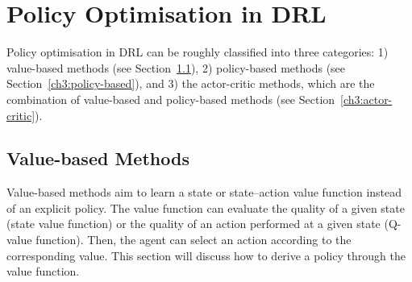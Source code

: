 \section{Policy Optimisation in DRL}
\label{ch3:policy-optim}
Policy optimisation in DRL can be roughly classified into three categories: 1) value-based methods (see Section~\ref{ch3:value-based}), 2) policy-based methods (see Section~\ref{ch3:policy-based}), and 3) the actor-critic methods, which are the combination of value-based and policy-based methods (see Section~\ref{ch3:actor-critic}).

\subsection{Value-based Methods}
\label{ch3:value-based}
Value-based methods aim to learn a state or state--action value function instead of an explicit policy. The value function can evaluate the quality of a given state (state value function) or the quality of an action performed at a given state (Q-value function). Then, the agent can select an action according to the corresponding value. This section will discuss how to derive a policy through the value function.


